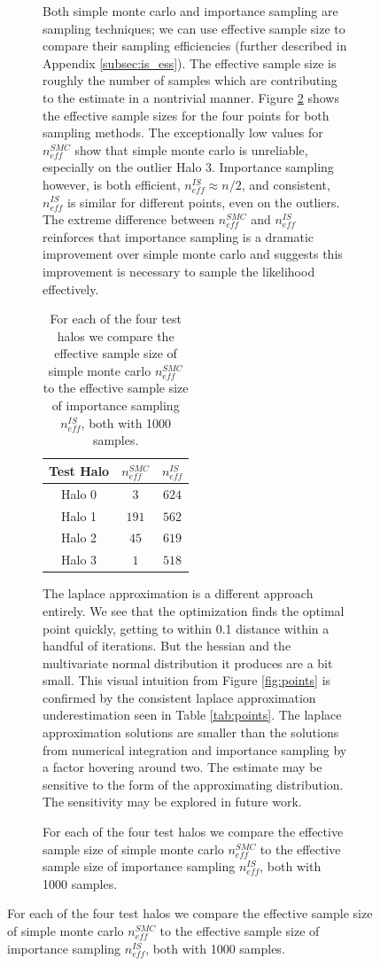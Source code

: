 \documentclass[\docopts]{\docclass}
\begin{document}
\begin{figure}[h!]
\begin{figure}[h!]
Both simple monte carlo and importance sampling are sampling techniques; we can use effective sample size to compare their sampling efficiencies (further described in Appendix \ref{subsec:is_ess}).
The effective sample size is roughly the number of samples which are contributing to the estimate in a nontrivial manner.
Figure \ref{fig:table} shows the effective sample sizes for the four points for both sampling methods. The exceptionally low values for $n_{eff}^{SMC}$ show that simple monte carlo is unreliable, especially on the outlier Halo 3.
Importance sampling however, is both efficient, $n_{eff}^{IS} \approx n/2$, and consistent, $n_{eff}^{IS}$ is similar for different points, even on the outliers.
The extreme difference between $n_{eff}^{SMC}$ and $n_{eff}^{IS}$ reinforces that importance sampling is a dramatic improvement over simple monte carlo and suggests this improvement is necessary to sample the likelihood effectively.

\begin{table}
\begin{center}
\begin{tabular}{|c|c|c|}
\hline
Test Halo & $n_{eff}^{SMC}$ & $n_{eff}^{IS}$\\ 
\hline
Halo 0 & $3$ & $624$\\
Halo 1 & $191$ & $562$\\
Halo 2 & $45$ & $619$\\
Halo 3 & $1$ & $518$\\
\hline
\end{tabular}
\end{center}
\caption{For each of the four test halos we compare the effective sample size of simple monte carlo $n_{eff}^{SMC}$ to the effective sample size of importance sampling $n_{eff}^{IS}$, both with 1000 samples.}
\label{fig:table}
\end{table}

The laplace approximation is a different approach entirely.
We see that the optimization finds the optimal point quickly, getting to within 0.1 distance within a handful of iterations.
But the hessian and the multivariate normal distribution it produces are a bit small.
This visual intuition from Figure \ref{fig:points} is confirmed by the consistent laplace approximation underestimation seen in Table \ref{tab:points}.
The laplace approximation solutions are smaller than the solutions from numerical integration and importance sampling by a factor hovering around two.
The estimate may be sensitive to the form of the approximating distribution.
The sensitivity may be explored in future work.


\end{figure}
\end{figure}
\end{document}

